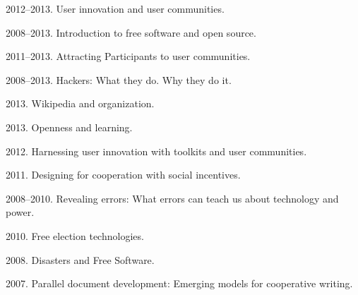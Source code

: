 \documentclass[10pt]{article}
\newenvironment{cvlist}{
\begin{list}{}{\leftmargin=3.0em \itemindent=-3.0em}
  \setlength{\itemsep}{0pt}
  \setlength{\parskip}{0em}
  \setlength{\parsep}{1em}
  \setlength{\parindent}{0em}}
{\vspace{1em}
\end{list}}
\begin{document}
\begin{cvlist}

\item 2012--2013. User innovation and user communities.
\item 2008--2013. Introduction to free software and open source.
\item 2011--2013. Attracting Participants to user communities.
\item 2008--2013. Hackers: What they do. Why they do it.
\item 2013. Wikipedia and organization.
\item 2013. Openness and learning.
\item 2012. Harnessing user innovation with toolkits and user communities.
\item 2011. Designing for cooperation with social incentives.
\item 2008--2010. Revealing errors: What errors can teach us about technology and power.
\item 2010. Free election technologies.
\item 2008. Disasters and Free Software.
\item 2007. Parallel document development: Emerging models for cooperative writing.






\end{cvlist}
\end{document}
